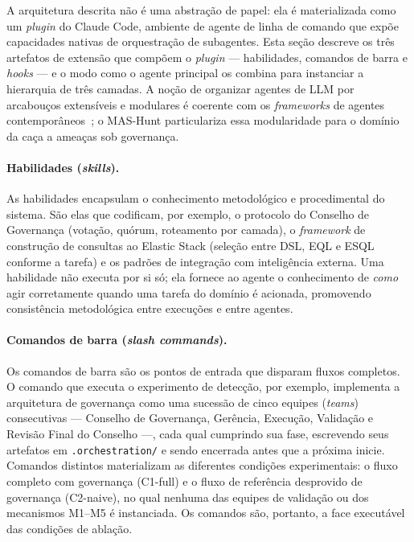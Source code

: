 A arquitetura descrita não é uma abstração de papel: ela é materializada como um
\emph{plugin} do Claude Code, ambiente de agente de linha de comando que expõe
capacidades nativas de orquestração de subagentes. Esta seção descreve os três
artefatos de extensão que compõem o \emph{plugin} — habilidades, comandos de
barra e \emph{hooks} — e o modo como o agente principal os combina para
instanciar a hierarquia de três camadas. A noção de organizar agentes de LLM por
arcabouços extensíveis e modulares é coerente com os \emph{frameworks} de agentes
contemporâneos~\cite{guo2024survey}; o MAS-Hunt particulariza essa modularidade
para o domínio da caça a ameaças sob governança.

\paragraph{Habilidades (\emph{skills}).} As habilidades encapsulam o conhecimento
metodológico e procedimental do sistema. São elas que codificam, por exemplo, o
protocolo do Conselho de Governança (votação, quórum, roteamento por camada), o
\emph{framework} de construção de consultas ao Elastic Stack (seleção entre DSL,
EQL e ES\textbar QL conforme a tarefa) e os padrões de integração com inteligência
externa. Uma habilidade não executa por si só; ela fornece ao agente o
conhecimento de \emph{como} agir corretamente quando uma tarefa do domínio é
acionada, promovendo consistência metodológica entre execuções e entre agentes.

\paragraph{Comandos de barra (\emph{slash commands}).} Os comandos de barra são os
pontos de entrada que disparam fluxos completos. O comando que executa o
experimento de detecção, por exemplo, implementa a arquitetura de governança como
uma sucessão de cinco equipes (\emph{teams}) consecutivas — Conselho de
Governança, Gerência, Execução, Validação e Revisão Final do Conselho —, cada
qual cumprindo sua fase, escrevendo seus artefatos em \texttt{.orchestration/} e
sendo encerrada antes que a próxima inicie. Comandos distintos materializam as
diferentes condições experimentais: o fluxo completo com governança (C1-full) e o
fluxo de referência desprovido de governança (C2-naive), no qual nenhuma das
equipes de validação ou dos mecanismos M1--M5 é instanciada. Os comandos são,
portanto, a face executável das condições de ablação.

